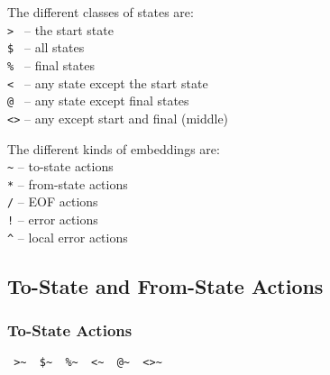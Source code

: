 \documentclass[letterpaper,11pt,oneside]{book}
\newcommand{\verbspace}{\vspace{10pt}}
\begin{document}
\begin{minipage}{\textwidth}
\begin{multicols}{2}
\raggedcolumns
\noindent The different classes of states are:\\
\fakeitem \verb|> | -- the start state \\
\fakeitem \verb|$ | -- all states\\
\fakeitem \verb|% | -- final states\\
\fakeitem \verb|< | -- any state except the start state\\
\fakeitem \verb|@ | -- any state except final states\\
\fakeitem \verb|<>| -- any except start and final (middle)

\columnbreak

\noindent The different kinds of embeddings are:\\
\fakeitem \verb|~| -- to-state actions\\
\fakeitem \verb|*| -- from-state actions\\
\fakeitem \verb|/| -- EOF actions\\
\fakeitem \verb|!| -- error actions\\
\fakeitem \verb|^| -- local error actions\\
\end{multicols}
\end{minipage}
%



\subsection{To-State and From-State Actions}

\subsubsection{To-State Actions}

\verb| >~  $~  %~  <~  @~  <>~ |
\verbspace
\end{document}
